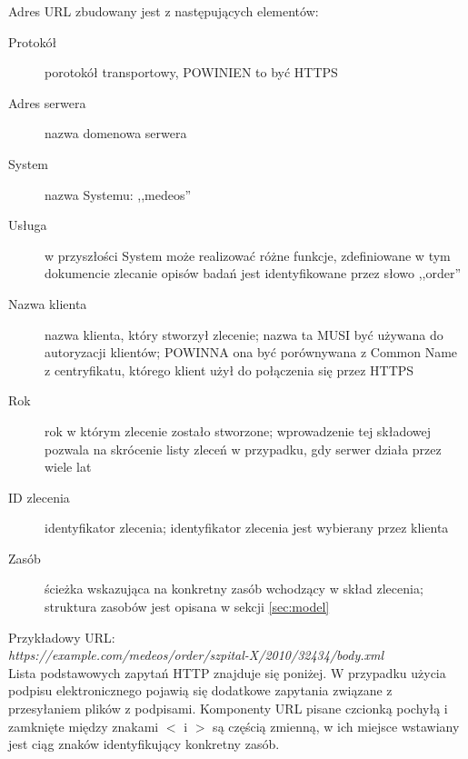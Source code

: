 \documentclass[a4paper]{article}
\begin{document}
Adres URL zbudowany jest z następujących elementów:
\begin{description}
  \item[Protokół] porotokół transportowy, POWINIEN to być HTTPS
  \item[Adres serwera] nazwa domenowa serwera 
  \item[System] nazwa Systemu: ,,medeos''
  \item[Usługa] w przyszłości System może realizować różne funkcje, zdefiniowane w
  tym dokumencie zlecanie opisów badań jest identyfikowane przez słowo ,,order''
  \item[Nazwa klienta] nazwa klienta, który stworzył zlecenie; nazwa ta MUSI być używana
  do autoryzacji klientów; POWINNA ona być porównywana z Common Name z centryfikatu,
  którego klient użył do połączenia się przez HTTPS
  \item[Rok] rok w którym zlecenie zostało stworzone; wprowadzenie tej składowej pozwala
  na skrócenie listy zleceń w przypadku, gdy serwer działa przez wiele lat
  \item[ID zlecenia] identyfikator zlecenia; identyfikator zlecenia jest wybierany przez
  klienta
  \item[Zasób] ścieżka wskazująca na konkretny zasób wchodzący w skład zlecenia;
  struktura zasobów jest opisana w sekcji \ref{sec:model}
\end{description}

Przykładowy URL:\\
\emph{https://example.com/medeos/order/szpital-X/2010/32434/body.xml}\\

Lista podstawowych zapytań HTTP znajduje się poniżej. W przypadku użycia
podpisu elektronicznego pojawią się dodatkowe zapytania związane z przesyłaniem
plików z podpisami. Komponenty URL pisane czcionką pochyłą i zamknięte między znakami $<$
i $>$ są częścią zmienną, w ich miejsce wstawiany jest ciąg znaków identyfikujący konkretny zasób.
\end{document}
